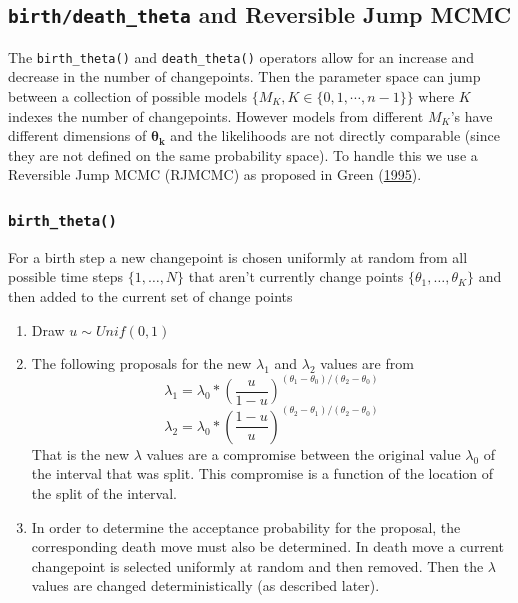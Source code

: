 \documentclass[11pt,a4paper]{article}
\numberwithin{equation}{section}
\begin{document}
\hypertarget{birthdeath_theta-and-reversible-jump-mcmc}{%
\subsection{\texorpdfstring{\texttt{birth/death\_theta} and Reversible
Jump
MCMC}{birth/death\_theta and Reversible Jump MCMC}}\label{birthdeath_theta-and-reversible-jump-mcmc}}

The \texttt{birth\_theta()} and \texttt{death\_theta()} operators allow
for an increase and decrease in the number of changepoints. Then the
parameter space can jump between a collection of possible models
\(\{M_K, K \in \{0,1,\cdots,n-1\}\}\) where \(K\) indexes the number of
changepoints. However models from different \(M_K\)'s have different
dimensions of \(\boldsymbol{\theta_k}\) and the likelihoods are not
directly comparable (since they are not defined on the same probability
space). To handle this we use a Reversible Jump MCMC (RJMCMC) as
proposed in Green (\protect\hyperlink{ref-green_reversible_1995}{1995}).

\hypertarget{birth_theta}{%
\subsubsection{\texorpdfstring{\texttt{birth\_theta()}}{birth\_theta()}}\label{birth_theta}}

For a birth step a new changepoint is chosen uniformly at random from
all possible time steps \(\{1,\dots,N\}\) that aren't currently change
points \(\{\theta_1,\dots,\theta_K\}\) and then added to the current set
of change points

\begin{enumerate}
\def\labelenumi{\arabic{enumi}.}
\item
  Draw \(u \sim Unif(0,1)\)
\item
  The following proposals for the new \(\lambda_1\) and \(\lambda_2\)
  values are from
  \[\lambda_1 = \lambda_0*(\frac{u}{1-u})^{(\theta_1-\theta_0)/(\theta_2-\theta_0)}\]
  \[\lambda_2 = \lambda_0*(\frac{1-u}{u})^{(\theta_2-\theta_1)/(\theta_2-\theta_0)}\]
  That is the new \(\lambda\) values are a compromise between the
  original value \(\lambda_0\) of the interval that was split. This
  compromise is a function of the location of the split of the interval.
\item
  In order to determine the acceptance probability for the proposal, the
  corresponding death move must also be determined. In death move a
  current changepoint is selected uniformly at random and then removed.
  Then the \(\lambda\) values are changed deterministically (as
  described later).
\end{enumerate}
\end{document}

